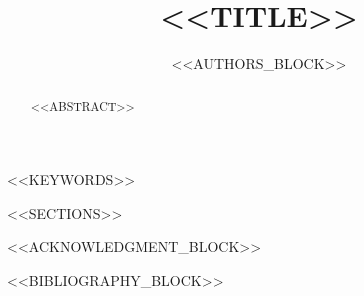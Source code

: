 \documentclass[conference]{IEEEtran}
\begin{document}
\title{<<TITLE>>}

\author{
<<AUTHORS_BLOCK>>
}

\maketitle

\begin{abstract}
<<ABSTRACT>>
\end{abstract}

\begin{IEEEkeywords}
<<KEYWORDS>>
\end{IEEEkeywords}

<<SECTIONS>>

<<ACKNOWLEDGMENT_BLOCK>>

<<BIBLIOGRAPHY_BLOCK>>
\end{document}
